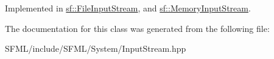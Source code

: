 Implemented in \mbox{\hyperlink{classsf_1_1_file_input_stream_a768c5fdb3be79e2d71d1bce911f8741c}{sf\+::\+File\+Input\+Stream}}, and \mbox{\hyperlink{classsf_1_1_memory_input_stream_a7ad4bdf721f29de8f66421ff29e23ee4}{sf\+::\+Memory\+Input\+Stream}}.



The documentation for this class was generated from the following file\+:\begin{DoxyCompactItemize}
\item 
S\+F\+M\+L/include/\+S\+F\+M\+L/\+System/Input\+Stream.\+hpp\end{DoxyCompactItemize}
